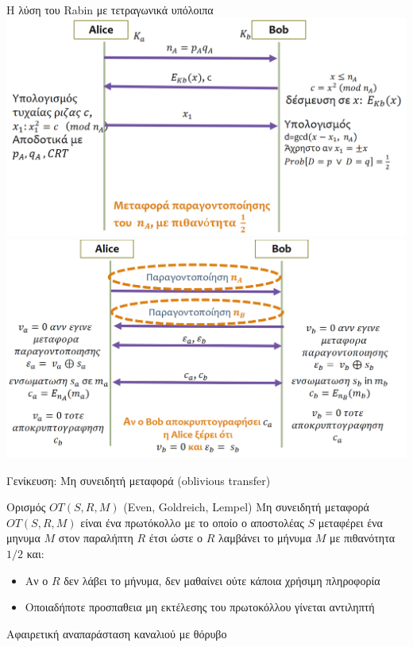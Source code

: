 \documentclass{beamer}
\begin{document}
\begin{frame}[allowframebreaks]{Η λύση του Rabin με τετραγωνικά υπόλοιπα}
	\includegraphics[scale=0.4]{rabinQR.png}
	\framebreak
	\includegraphics[scale=0.4]{rabinEOS.png}
\end{frame}

\begin{frame}{Γενίκευση: Μη συνειδητή μεταφορά (oblivious transfer)}
\begin{block}{Ορισμός $OT(S,R,M)$ (Even, Goldreich, Lempel)}
	Μη συνειδητή μεταφορά $OT(S,R,M)$ είναι ένα πρωτόκολλο με το οποίο ο αποστολέας $S$ μεταφέρει ένα μηνυμα $M$ στον παραλήπτη $R$ έτσι ώστε ο $R$ λαμβάνει το μήνυμα $Μ$ με πιθανότητα $1/2$ και:
	\begin{itemize}
		\item Αν ο $R$ δεν λάβει το μήνυμα, δεν μαθαίνει ούτε κάποια χρήσιμη πληροφορία
		\item Οποιαδήποτε προσπαθεια μη εκτέλεσης του πρωτοκόλλου γίνεται αντιληπτή
	\end{itemize}
\end{block}
Αφαιρετική αναπαράσταση καναλιού με θόρυβο
\end{frame}
\end{document}
